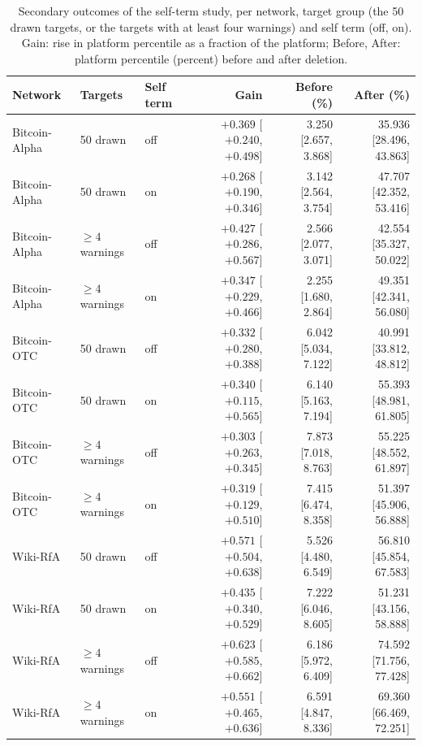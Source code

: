 \begin{table}[!t]
\centering
\scriptsize
\setlength{\tabcolsep}{3pt}
\caption{Secondary outcomes of the self-term study, per network, target group (the 50 drawn targets, or the targets with at least four warnings) and self term (off, on). Gain: rise in platform percentile as a fraction of the platform; Before, After: platform percentile (percent) before and after deletion.}
\label{tab:s_s_self_term_secondary}
\begin{tabular}{@{}lllrrr@{}}
\toprule
\textbf{Network} & \textbf{Targets} & \textbf{Self term} & \textbf{Gain} & \textbf{Before (\%)} & \textbf{After (\%)} \\
\midrule
Bitcoin-Alpha & 50 drawn & off & $+0.369$ [$+0.240$, $+0.498$] & 3.250 [2.657, 3.868] & 35.936 [28.496, 43.863] \\
Bitcoin-Alpha & 50 drawn & on & $+0.268$ [$+0.190$, $+0.346$] & 3.142 [2.564, 3.754] & 47.707 [42.352, 53.416] \\
Bitcoin-Alpha & $\ge 4$ warnings & off & $+0.427$ [$+0.286$, $+0.567$] & 2.566 [2.077, 3.071] & 42.554 [35.327, 50.022] \\
Bitcoin-Alpha & $\ge 4$ warnings & on & $+0.347$ [$+0.229$, $+0.466$] & 2.255 [1.680, 2.864] & 49.351 [42.341, 56.080] \\
Bitcoin-OTC & 50 drawn & off & $+0.332$ [$+0.280$, $+0.388$] & 6.042 [5.034, 7.122] & 40.991 [33.812, 48.812] \\
Bitcoin-OTC & 50 drawn & on & $+0.340$ [$+0.115$, $+0.565$] & 6.140 [5.163, 7.194] & 55.393 [48.981, 61.805] \\
Bitcoin-OTC & $\ge 4$ warnings & off & $+0.303$ [$+0.263$, $+0.345$] & 7.873 [7.018, 8.763] & 55.225 [48.552, 61.897] \\
Bitcoin-OTC & $\ge 4$ warnings & on & $+0.319$ [$+0.129$, $+0.510$] & 7.415 [6.474, 8.358] & 51.397 [45.906, 56.888] \\
Wiki-RfA & 50 drawn & off & $+0.571$ [$+0.504$, $+0.638$] & 5.526 [4.480, 6.549] & 56.810 [45.854, 67.583] \\
Wiki-RfA & 50 drawn & on & $+0.435$ [$+0.340$, $+0.529$] & 7.222 [6.046, 8.605] & 51.231 [43.156, 58.888] \\
Wiki-RfA & $\ge 4$ warnings & off & $+0.623$ [$+0.585$, $+0.662$] & 6.186 [5.972, 6.409] & 74.592 [71.756, 77.428] \\
Wiki-RfA & $\ge 4$ warnings & on & $+0.551$ [$+0.465$, $+0.636$] & 6.591 [4.847, 8.336] & 69.360 [66.469, 72.251] \\
\bottomrule
\end{tabular}
\end{table}

